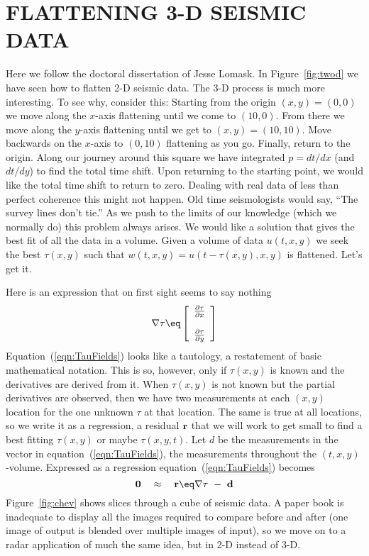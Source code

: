 \section{FLATTENING 3-D SEISMIC DATA}

Here we follow the doctoral dissertation of Jesse Lomask.
In Figure~\ref{fig:twod} we have seen how to flatten 2-D seismic data.
The 3-D process is much more interesting. 
To see why,
consider this: Starting from the origin $(x , y ) = (0, 0)$
we move along the $x$-axis flattening until we come to $(10, 0)$.
From there we move along the $y$-axis flattening until we get to
$(x , y ) = (10, 10)$.
Move backwards on the $x$-axis to $(0, 10)$ flattening as you go.
Finally, return to the origin.
Along our journey around this square we have integrated
$p = d t /d x$ (and $d t /d y$) to find the total time shift.
Upon returning to the starting point,
we would like the total time shift to return to zero. 
Dealing with real data of less than perfect coherence this might not happen.
Old time seismologists would say, ``The survey lines don't tie.''
As we push to the limits of our knowledge (which we normally do)
this problem always arises.
We would like a solution that gives the best fit of all the data in a volume.
Given a volume of data $u (t , x , y )$ we seek
the best $\tau (x , y )$ such that
$w(t , x , y )= u (t-\tau (x , y ), x , y )$
is  flattened. Let's get it. 
\par
Here is an expression that on first sight seems to say nothing
\begin{equation}
\nabla \tau \eq 
\left[
\begin{array}{c}
\frac{\partial \tau}{\partial x} \\
\\
\frac{\partial \tau}{\partial y}
\end{array}
\right] \label{eqn:TauFields}
\end{equation}
Equation~(\ref{eqn:TauFields}) looks like a tautology,
a restatement of basic mathematical notation. 
This is so, however,
only if $\tau (x , y )$ is known and the derivatives are derived from it.
When $\tau (x , y )$ is not known but the partial derivatives are observed,
then we have two measurements at each $(x , y )$ location
for the one unknown $\tau$ at that location. 
The same is true at all locations,
so we write it as a regression, a residual ${\bf r}$ that we 
will work to get small to find a best fitting
$\tau (x , y )$ or maybe $\tau (x , y , t )$.
Let $d$ be the measurements in the vector in equation~(\ref{eqn:TauFields}),
the measurements throughout the $(t , x , y )$-volume.
Expressed as a regression equation~(\ref{eqn:TauFields}) becomes 
\begin{equation}
{\bf 0} \quad \approx\quad  {\bf r} \eq \nabla \tau \ -\  {\bf d}
\end{equation}
Figure~\ref{fig:chev} shows slices through a cube of seismic data.
A paper book is inadequate to display all the images required
to compare before and after
(one image of output is blended over multiple images of input),
so we move on to a radar application of much the same idea,
but in 2-D instead of 3-D.

